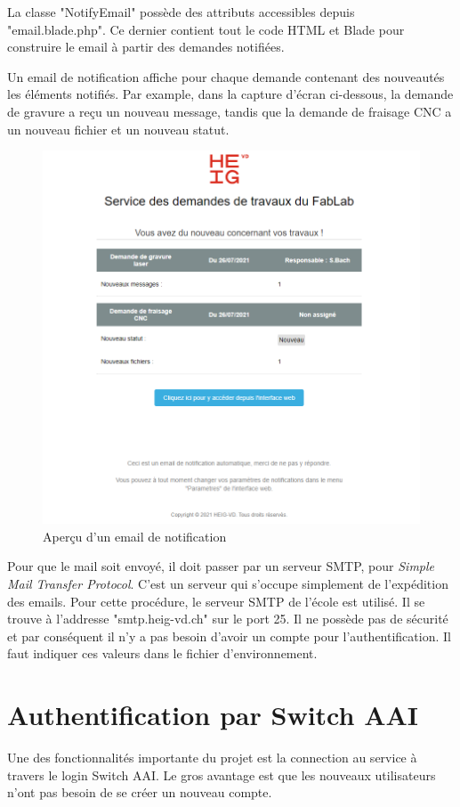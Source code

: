 \documentclass[
    iai, %
    eai, %
]{heig-tb}
\begin{document}
La classe "NotifyEmail" possède des attributs accessibles depuis "email.blade.php". Ce dernier contient tout le code HTML et Blade pour construire le email à partir des demandes notifiées.

\newpage
Un email de notification affiche pour chaque demande contenant des nouveautés les éléments notifiés. Par example, dans la capture d'écran ci-dessous, la demande de gravure a reçu un nouveau message, tandis que la demande de fraisage CNC a un nouveau fichier et un nouveau statut.

\begin{figure}[h]
  \includegraphics[width=14cm]{email.PNG}
  \caption{Aperçu d'un email de notification}
\end{figure}

Pour que le mail soit envoyé, il doit passer par un serveur SMTP, pour \emph{Simple Mail Transfer Protocol}. C'est un serveur qui s'occupe simplement de l'expédition des emails.
Pour cette procédure, le serveur SMTP de l'école est utilisé. Il se trouve à l'addresse "smtp.heig-vd.ch" sur le port 25. Il ne possède pas de sécurité et par conséquent il n'y a pas besoin d'avoir un compte pour l'authentification. Il faut indiquer ces valeurs dans le fichier d'environnement.

\newpage
\section{Authentification par Switch AAI}
Une des fonctionnalités importante du projet est la connection au service à travers le login Switch AAI.
Le gros avantage est que les nouveaux utilisateurs n'ont pas besoin de se créer un nouveau compte.
\end{document}
